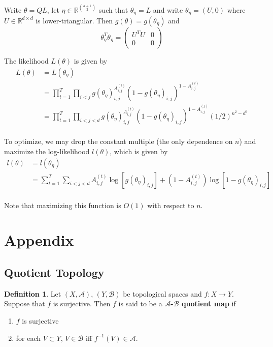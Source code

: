 \documentclass[12pt]{amsart}
\theoremstyle{definition}
\newtheorem{defn}[definition]{Definition}
\newcommand{\R}{\mathbb{R}}
\newcommand{\MA}{\mathcal{A}}
\newcommand{\MB}{\mathcal{B}}
\newcommand{\ld}[1]{\label{defn:#1}}
\begin{document}
	Write $\theta = QL$, let $\eta \in \R^{{d+1 \choose 2}}$ such that $\theta_{\eta} = L$ and write $\theta_{\eta} = (U, 0)$ where $U \in \R^{d \times d}$ is lower-triangular. Then $g(\theta) = g(\theta_{\eta})$ and 
\[ \theta_{\eta}^T\theta_{\eta} = 
\begin{pmatrix}
U^TU & 0 \\
0 & 0
\end{pmatrix}
\]

The likelihood $L(\theta)$ is given by 
\begin{align*}
L(\theta) 
&= L(\theta_{\eta}) \\
&= \prod_{t=1}^T \prod_{i < j} g(\theta_{\eta})_{i,j}^{A^{(t)}_{i,j}}(1 - g(\theta_{\eta})_{i,j})^{1 - A^{(t)}_{i,j}}\\
&= \prod_{t=1}^T \prod_{i < j < d} g(\theta_{\eta})_{i,j}^{A^{(t)}_{i,j}}(1 - g(\theta_{\eta})_{i,j})^{1 - A^{(t)}_{i,j}} (1/2)^{n^2 - d^2}\\
\end{align*}

To optimize, we may drop the constant multiple (the only dependence on $n$) and maximize the log-likelihood $l(\theta)$, which is given by 
\begin{align*}
l(\theta) 
&= l(\theta_{\eta}) \\
&= \sum_{t=1}^T \sum_{i < j < d} A^{(t)}_{i,j} \log [g(\theta_{\eta})_{i,j}] + (1 - A^{(t)}_{i,j}) \log[1 - g(\theta_{\eta})_{i,j}] \\
\end{align*}
	
Note that maximizing this function is $O(1)$ with respect to $n$.
	
	
	
	
	
	
	
	
	
	
	
	
	
	
	
	
	
	
	\newpage
	\section{Appendix}
	
	\subsection{Quotient Topology}
	
	\begin{defn} \ld{34001}
	Let $(X, \MA)$, $(Y, \MB)$ be topological spaces and $f:X \rightarrow Y$. Suppose that $f$ is surjective. Then $f$ is said to be a \textbf{$\MA$-$\MB$ quotient map} if 
	\begin{enumerate}
	\item $f$ is surjective
	\item for each $V \subset Y$, $V \in \MB$ iff $f^{-1}(V) \in \MA$.
	\end{enumerate}
	\end{defn}
	
\end{document}
